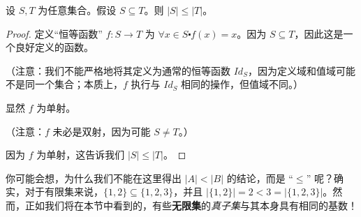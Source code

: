 \begin{lemma}\label{lemma7.6.11}
    设 $S, T$ 为任意集合。假设 $S \subseteq T$。则 $|S| \le |T|$。
\end{lemma}

\begin{proof}
    定义``恒等函数'' $f : S \to T$ 为 $\forall x \in S \centerdot f(x) = x$。因为 $S \subseteq T$，因此这是一个良好定义的函数。

    （注意：我们不能严格地将其定义为通常的恒等函数 $Id_S$，因为定义域和值域可能不是同一个集合；本质上，$f$ 执行与 $Id_S$ 相同的操作，但值域不同。）

    显然 $f$ 为单射。

    （注意：$f$ 未必是双射，因为可能 $S \ne T$。）

    因为 $f$ 为单射，这告诉我们 $|S| \le |T|$。
\end{proof}

你可能会想，为什么我们不能在这里得出 $|A| < |B|$ 的结论，而是 ``$\le$'' 呢？确实，对于有限集来说，$\{1, 2\} \subseteq \{1, 2, 3\}$，并且 $|\{1, 2\}| = 2 < 3 = |\{1, 2, 3\}|$。然而，正如我们将在本节中看到的，有些\textbf{无限集}的\emph{真子集}与其本身具有相同的基数！\\

